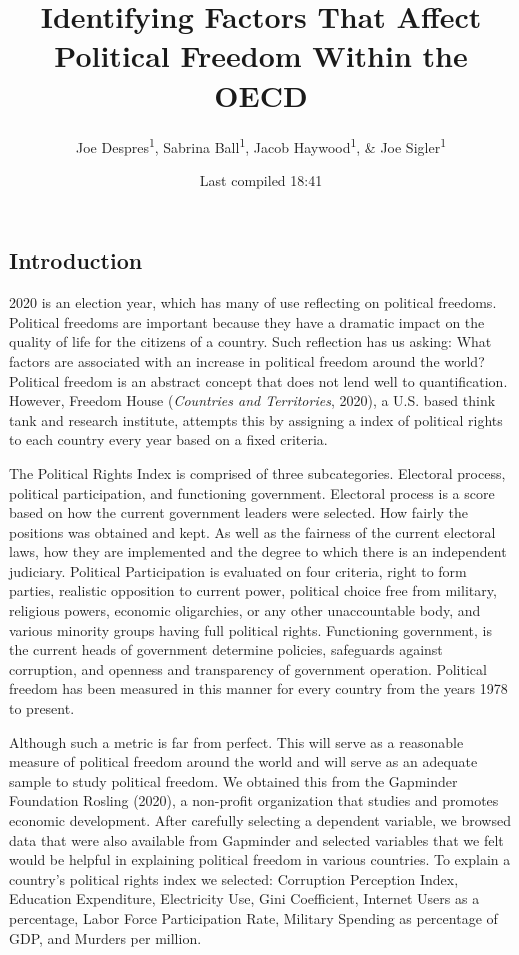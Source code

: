 \documentclass[
  english,
  man,floatsintext]{apa6}
\title{Identifying Factors That Affect Political Freedom Within the OECD}
\author{Joe Despres\textsuperscript{1}, Sabrina Ball\textsuperscript{1}, Jacob Haywood\textsuperscript{1}, \& Joe Sigler\textsuperscript{1}}
\date{Last compiled 18:41}
\affiliation{\vspace{0.5cm}\textsuperscript{1} Michigan State University}
\begin{document}
\maketitle

\hypertarget{introduction}{%
\subsection{Introduction}\label{introduction}}

2020 is an election year, which has many of use reflecting on political freedoms. Political freedoms are important because they have a dramatic impact on the quality of life for the citizens of a country. Such reflection has us asking: What factors are associated with an increase in political freedom around the world? Political freedom is an abstract concept that does not lend well to quantification. However, Freedom House (\emph{Countries and Territories}, 2020), a U.S. based think tank and research institute, attempts this by assigning a index of political rights to each country every year based on a fixed criteria.

The Political Rights Index is comprised of three subcategories. Electoral process, political participation, and functioning government. Electoral process is a score based on how the current government leaders were selected. How fairly the positions was obtained and kept. As well as the fairness of the current electoral laws, how they are implemented and the degree to which there is an independent judiciary. Political Participation is evaluated on four criteria, right to form parties, realistic opposition to current power, political choice free from military, religious powers, economic oligarchies, or any other unaccountable body, and various minority groups having full political rights. Functioning government, is the current heads of government determine policies, safeguards against corruption, and openness and transparency of government operation. Political freedom has been measured in this manner for every country from the years 1978 to present.

Although such a metric is far from perfect. This will serve as a reasonable measure of political freedom around the world and will serve as an adequate sample to study political freedom. We obtained this from the Gapminder Foundation Rosling (2020), a non-profit organization that studies and promotes economic development. After carefully selecting a dependent variable, we browsed data that were also available from Gapminder and selected variables that we felt would be helpful in explaining political freedom in various countries. To explain a country's political rights index we selected: Corruption Perception Index, Education Expenditure, Electricity Use, Gini Coefficient, Internet Users as a percentage, Labor Force Participation Rate, Military Spending as percentage of GDP, and Murders per million.
\end{document}
